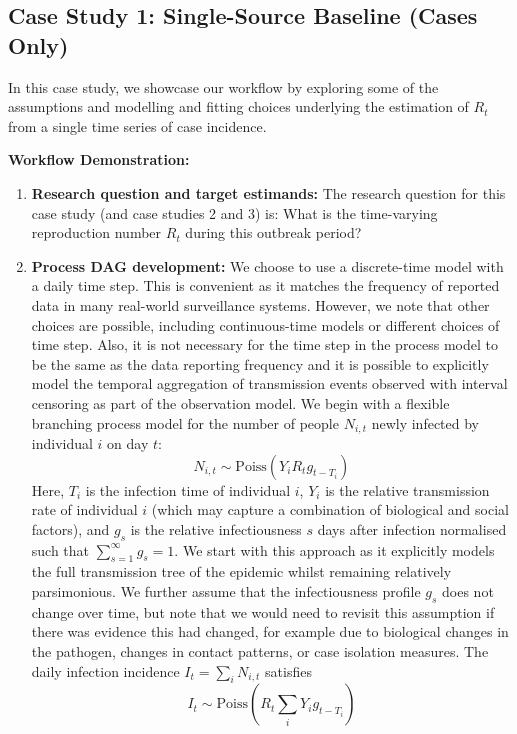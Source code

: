 \documentclass{article}
\begin{document}
\subsection{Case Study 1: Single-Source Baseline (Cases Only)}


In this case study, we showcase our workflow by exploring some of the assumptions and modelling and fitting choices underlying the estimation of $R_t$ from a single time series of case incidence.

\textbf{Workflow Demonstration:}
\begin{enumerate}
    \item \textbf{Research question and target estimands:} The research question for this case study (and case studies 2 and 3) is: What is the time-varying reproduction number $R_t$ during this outbreak period?

    \item \textbf{Process DAG development:} We choose to use a discrete-time model with a daily time step. This is convenient as it matches the frequency of reported data in many real-world surveillance systems. However, we note that other choices are possible, including continuous-time models or different choices of time step. Also, it is not necessary for the time step in the process model to be the same as the data reporting frequency and it is possible to explicitly model the temporal aggregation of transmission events observed with interval censoring as part of the observation model. We begin with a flexible branching process model for the number of people $N_{i,t}$ newly infected by individual $i$ on day $t$:
    \begin{equation} \label{eq:individual_level}
         N_{i,t} \sim \mathrm{Poiss} \left( Y_i R_t g_{t-T_i} \right)
    \end{equation} 
    Here, $T_i$ is the infection time of individual $i$, $Y_i$ is the relative transmission rate of individual $i$ (which may capture a combination of biological and social factors), and $g_s$ is the relative infectiousness $s$ days after infection normalised such that $\sum_{s=1}^\infty g_s=1$. We start with this approach as it explicitly models the full transmission tree of the epidemic whilst remaining relatively parsimonious. We further assume that the infectiousness profile $g_s$ does not change over time, but note that we would need to revisit this assumption if there was evidence this had changed, for example due to biological changes in the pathogen, changes in contact patterns, or case isolation measures. The daily infection incidence $I_t=\sum_i N_{i,t}$ satisfies
    \begin{equation} \label{eq:It_with_hetergoeneity}
        I_t \sim \mathrm{Poiss}\left( R_t \sum_i Y_i g_{t-T_i} \right)
    \end{equation}



\end{enumerate}
\end{document}
